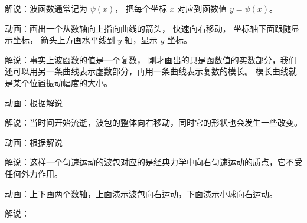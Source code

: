 解说：波函数通常记为 $\psi(x)$， 把每个坐标 $x$ 对应到函数值 $y = \psi(x)$。

动画：画出一个从数轴向上指向曲线的箭头， 快速向右移动， 坐标轴下面跟随显示坐标， 箭头上方画水平线到 $y$ 轴，显示 $y$ 坐标。

解说：事实上波函数的值是一个复数， 刚才画出的只是函数值的实数部分，我们还可以用另一条曲线表示虚数部分，再用一条曲线表示复数的模长。 模长曲线就是某个位置振动幅度的大小。

动画：根据解说

解说：当时间开始流逝，波包的整体向右移动，同时它的形状也会发生一些改变。

动画：根据解说

解说：这样一个匀速运动的波包对应的是经典力学中向右匀速运动的质点，它不受任何外力作用。

动画：上下画两个数轴，上面演示波包向右运动，下面演示小球向右运动。

解说：
